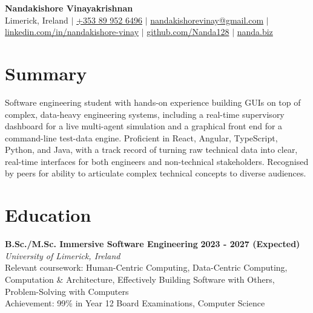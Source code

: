 \documentclass[10pt,a4paper]{article}
\newcommand{\cvEntry}[4]{%
  \noindent\textbf{#1} \hfill \textbf{\small #2} \\
  \textit{#3} \hfill \textit{\small #4} \\[-2pt]
}
\begin{document}
\begin{center}
    {\LARGE \textbf{Nandakishore Vinayakrishnan}}\\[4pt]
    \small
    Limerick, Ireland \quad $\vert$ \quad
    \href{tel:+353899526496}{+353 89 952 6496} \quad $\vert$ \quad
    \href{mailto:nandakishorevinay@gmail.com}{nandakishorevinay@gmail.com} \quad $\vert$ \quad
    \href{https://www.linkedin.com/in/nandakishore-vinay}{linkedin.com/in/nandakishore-vinay} \quad $\vert$ \quad
    \href{https://github.com/Nanda128}{github.com/Nanda128} \quad $\vert$ \quad
    \href{https://www.nanda.biz}{nanda.biz}
\end{center}

\vspace{-6pt}

\section*{Summary}
\small
Software engineering student with hands-on experience building GUIs on top of complex, data-heavy engineering systems, including a real-time supervisory dashboard for a live multi-agent simulation and a graphical front end for a command-line test-data engine.
Proficient in React, Angular, TypeScript, Python, and Java, with a track record of turning raw technical data into clear, real-time interfaces for both engineers and non-technical stakeholders.
Recognised by peers for ability to articulate complex technical concepts to diverse audiences.

\vspace{1pt}

\section{Education}\label{sec:education}
\cvEntry{B.Sc./M.Sc. Immersive Software Engineering}{2023 - 2027 (Expected)}{University of Limerick, Ireland}{}
\vspace{2pt}
\small
Relevant coursework: Human-Centric Computing, Data-Centric Computing, Computation \& Architecture, Effectively Building Software with Others, Problem-Solving with Computers \\
Achievement: 99\% in Year 12 Board Examinations, Computer Science

\vspace{2pt}

\end{document}
